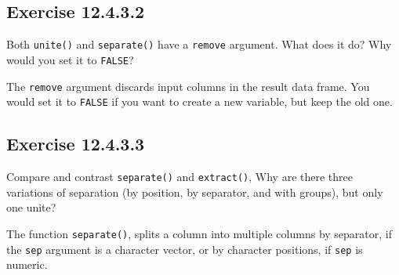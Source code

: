 \documentclass[]{book}
\newenvironment{Shaded}{\begin{snugshade}}{\end{snugshade}}
\newcommand{\CommentTok}[1]{\textcolor[rgb]{0.56,0.35,0.01}{\textit{#1}}}
\newcommand{\DataTypeTok}[1]{\textcolor[rgb]{0.13,0.29,0.53}{#1}}
\newcommand{\KeywordTok}[1]{\textcolor[rgb]{0.13,0.29,0.53}{\textbf{#1}}}
\newcommand{\NormalTok}[1]{#1}
\newcommand{\OperatorTok}[1]{\textcolor[rgb]{0.81,0.36,0.00}{\textbf{#1}}}
\newcommand{\StringTok}[1]{\textcolor[rgb]{0.31,0.60,0.02}{#1}}
\theoremstyle{plain}
\theoremstyle{remark}
\begin{document}
\begin{Shaded}
\end{Shaded}

\hypertarget{exercise-12.4.3.2}{%
\subsection*{\texorpdfstring{Exercise {12.4.3.2}}{Exercise 12.4.3.2}}\label{exercise-12.4.3.2}}

Both \texttt{unite()} and \texttt{separate()} have a \texttt{remove} argument. What does it do? Why would you set it to \texttt{FALSE}?

The \texttt{remove} argument discards input columns in the result data frame. You would set it to \texttt{FALSE} if you want to create a new variable, but keep the old one.

\hypertarget{exercise-12.4.3.3}{%
\subsection*{\texorpdfstring{Exercise {12.4.3.3}}{Exercise 12.4.3.3}}\label{exercise-12.4.3.3}}

Compare and contrast \texttt{separate()} and \texttt{extract()}, Why are there three variations of separation (by position, by separator, and with groups), but only one unite?

The function \texttt{separate()}, splits a column into multiple columns by separator, if the \texttt{sep} argument is a character vector, or by character positions, if \texttt{sep} is numeric.
\end{document}
